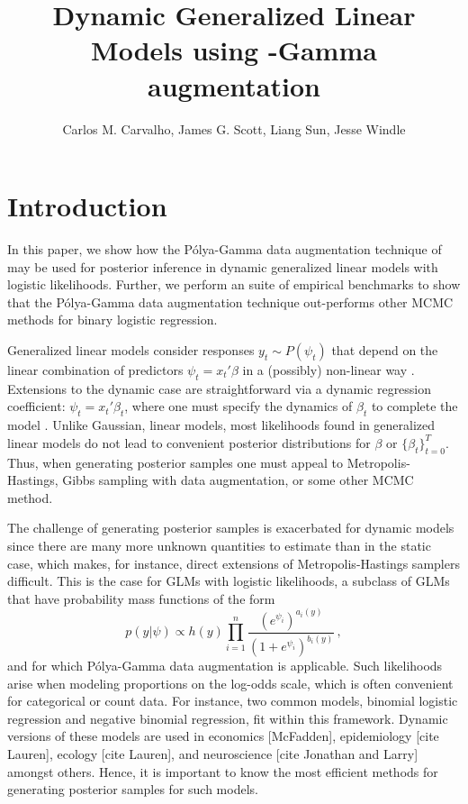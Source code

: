 \documentclass[11pt]{article}
\title{Dynamic Generalized Linear Models using \Polya-Gamma augmentation}
\author{Carlos M. Carvalho, James G. Scott, Liang Sun, Jesse Windle}
\newcommand{\Polya}{P\'{o}lya}
\begin{document}
\maketitle
\tableofcontents

\newpage

\section{Introduction}

In this paper, we show how the \Polya-Gamma data augmentation technique of
\cite{polson-etal-2012} may be used for posterior inference in dynamic
generalized linear models with logistic likelihoods.  Further, we perform an
suite of empirical benchmarks to show that the \Polya-Gamma data augmentation
technique out-performs other MCMC methods for binary logistic regression.

Generalized linear models consider responses $y_t \sim P(\psi_t)$ that depend on
the linear combination of predictors $\psi_t = x_t' \beta$ in a (possibly)
non-linear way \citep{mccullagh-nelder-1989}.  Extensions to the dynamic case
are straightforward via a dynamic regression coefficient: $\psi_t = x_t'
\beta_t$, where one must specify the dynamics of $\beta_t$ to complete the model
.  Unlike Gaussian, linear models, most likelihoods found in generalized linear
models do not lead to convenient posterior distributions for $\beta$ or
$\{\beta_t\}_{t=0}^T$.  Thus, when generating posterior samples one must appeal
to Metropolis-Hastings, Gibbs sampling with data augmentation, or some other
MCMC method.

The challenge of generating posterior samples is exacerbated for dynamic models
since there are many more unknown quantities to estimate than in the static
case, which makes, for instance, direct extensions of Metropolis-Hastings
samplers difficult.  This is the case for GLMs with logistic likelihoods, a
subclass of GLMs that have probability mass functions of the form
\[
p(y | \psi) \propto h(y) \prod_{i=1}^n
\frac{(e^{\psi_i})^{a_i(y)}}{(1+e^{\psi_i})^{b_i(y)}} \, ,
\]
and for which \Polya-Gamma data augmentation is applicable.  Such likelihoods
arise when modeling proportions on the log-odds scale, which is often convenient
for categorical or count data.  For instance, two common models, binomial
logistic regression and negative binomial regression, fit within this framework.
Dynamic versions of these models are used in economics [McFadden], epidemiology
[cite Lauren], ecology [cite Lauren], and neuroscience [cite Jonathan and Larry]
amongst others.  Hence, it is important to know the most efficient methods for
generating posterior samples for such models.
\end{document}
